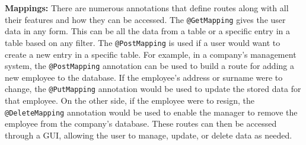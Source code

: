     \textbf{Mappings:} \newline
    There are numerous annotations that define routes along with all their features and how they can be accessed. The \texttt{@GetMapping} gives the user data in any form. This can be all the data from a table or a specific entry in a table based on any filter. The \texttt{@PostMapping} is used if a user would want to create a new entry in a specific table. \newline
    For example, in a company's management system, the \texttt{@PostMapping} annotation can be used to build a route for adding a new employee to the database. If the employee's address or surname were to change, the \texttt{@PutMapping} annotation would be used to update the stored data for that employee. On the other side, if the employee were to resign, the \texttt{@DeleteMapping} annotation would be used to enable the manager to remove the employee from the company's database. \newline
    These routes can then be accessed through a GUI, allowing the user to manage, update, or delete data as needed. \Autocite{Andi:JPA}
    
